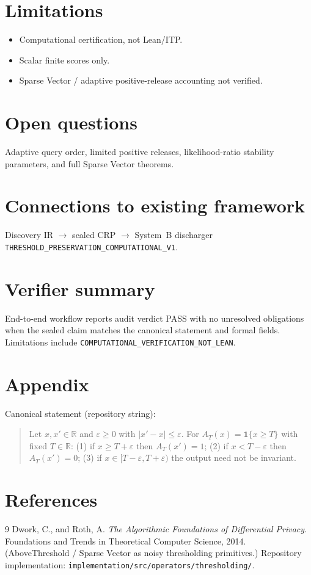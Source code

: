 \documentclass[11pt]{article}
\begin{document}
\section{Limitations}
\begin{itemize}
\item Computational certification, not Lean/ITP.
\item Scalar finite scores only.
\item Sparse Vector / adaptive positive-release accounting not verified.
\end{itemize}

\section{Open questions}
Adaptive query order, limited positive releases, likelihood-ratio stability
parameters, and full Sparse Vector theorems.

\section{Connections to existing framework}
Discovery IR \(\to\) sealed CRP \(\to\) System~B discharger
\texttt{THRESHOLD\_PRESERVATION\_COMPUTATIONAL\_V1}.

\section{Verifier summary}
End-to-end workflow reports audit verdict PASS with no unresolved obligations
when the sealed claim matches the canonical statement and formal fields.
Limitations include \texttt{COMPUTATIONAL\_VERIFICATION\_NOT\_LEAN}.

\section{Appendix}
Canonical statement (repository string):
\begin{quote}\small
Let \(x,x'\in\mathbb{R}\) and \(\varepsilon\ge 0\) with \(\lvert x'-x\rvert\le\varepsilon\).
For \(A_T(x)=\mathbf{1}\{x\ge T\}\) with fixed \(T\in\mathbb{R}\):
(1) if \(x\ge T+\varepsilon\) then \(A_T(x')=1\);
(2) if \(x<T-\varepsilon\) then \(A_T(x')=0\);
(3) if \(x\in[T-\varepsilon,T+\varepsilon)\) the output need not be invariant.
\end{quote}

\section*{References}
\begin{thebibliography}{9}
Dwork, C., and Roth, A.
\emph{The Algorithmic Foundations of Differential Privacy}.
Foundations and Trends in Theoretical Computer Science, 2014.
(AboveThreshold / Sparse Vector as noisy thresholding primitives.)
Repository implementation:
\texttt{implementation/src/operators/thresholding/}.
\end{thebibliography}
\end{document}
